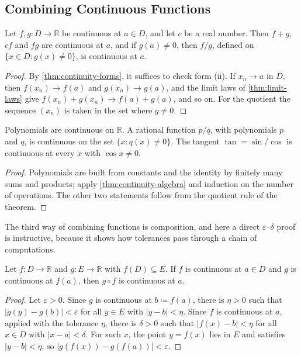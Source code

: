 \subsection{Combining Continuous Functions}

\begin{theorem}
\label{thm:continuity-algebra}
Let $f,g\colon D\to\mathbb R$ be continuous at $a\in D$, and let $c$ be a real number. Then $f+g$, $cf$ and $fg$ are continuous at $a$, and if $g(a)\ne0$, then $f/g$, defined on $\{x\in D: g(x)\ne0\}$, is continuous at $a$.
\end{theorem}

\begin{proof}
By \cref{thm:continuity-forms}, it suffices to check form (ii). If $x_n\to a$ in $D$, then $f(x_n)\to f(a)$ and $g(x_n)\to g(a)$, and the limit laws of \cref{thm:limit-laws} give $f(x_n)+g(x_n)\to f(a)+g(a)$, and so on. For the quotient the sequence $(x_n)$ is taken in the set where $g\ne0$.
\end{proof}

\begin{corollary}
\label{cor:rational-continuous}
Polynomials are continuous on $\mathbb R$. A rational function $p/q$, with polynomials $p$ and $q$, is continuous on the set $\{x: q(x)\ne0\}$. The tangent $\tan=\sin/\cos$ is continuous at every $x$ with $\cos x\ne0$.
\end{corollary}

\begin{proof}
Polynomials are built from constants and the identity by finitely many sums and products; apply \cref{thm:continuity-algebra} and induction on the number of operations. The other two statements follow from the quotient rule of the theorem.
\end{proof}

The third way of combining functions is composition, and here a direct $\varepsilon$--$\delta$ proof is instructive, because it shows how tolerances pass through a chain of computations.

\begin{theorem}
\label{thm:composition-continuous}
Let $f\colon D\to\mathbb R$ and $g\colon E\to\mathbb R$ with $f(D)\subseteq E$. If $f$ is continuous at $a\in D$ and $g$ is continuous at $f(a)$, then $g\circ f$ is continuous at $a$.
\end{theorem}

\begin{proof}
Let $\varepsilon>0$. Since $g$ is continuous at $b\coloneqq f(a)$, there is $\eta>0$ such that $|g(y)-g(b)|<\varepsilon$ for all $y\in E$ with $|y-b|<\eta$. Since $f$ is continuous at $a$, applied with the tolerance $\eta$, there is $\delta>0$ such that $|f(x)-b|<\eta$ for all $x\in D$ with $|x-a|<\delta$. For such $x$, the point $y=f(x)$ lies in $E$ and satisfies $|y-b|<\eta$, so $|g(f(x))-g(f(a))|<\varepsilon$.
\end{proof}

